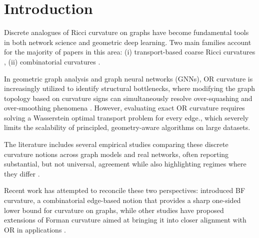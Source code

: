 \documentclass[twoside,11pt]{article}
\numberwithin{equation}{section}
\numberwithin{theorem}{section}
\numberwithin{example}{section}
\begin{document}

\section{Introduction}
\label{sec:introduction}
Discrete analogues of Ricci curvature on graphs have become fundamental tools in both network science and geometric deep learning. Two main families account for the majority of papers in this area: (i) transport-based coarse Ricci curvatures \citep{ollivier_ricci_2009, lin_curvature_2011}, (ii) combinatorial curvatures \citep{forman_method_2003,sreejith_forman_2016,weber_forman_2016,samal_comparative_2018}.

In geometric graph analysis and graph neural networks (GNNs), OR curvature is increasingly utilized to identify structural bottlenecks, where modifying the graph topology based on curvature signs can simultaneously resolve over-squashing and over-smoothing phenomena \citep[e.g.][]{nguyen_over_2023,liu_curvdrop_2023}. However, evaluating exact OR curvature requires solving a Wasserstein optimal transport problem for every edge., which severely limits the scalability of principled, geometry-aware algorithms on large datasets. 

The literature includes several empirical studies comparing these discrete curvature notions across graph models and real networks, often reporting substantial, but not universal, agreement while also highlighting regimes where they differ \citep{sreejith_systematic_2017, samal_comparative_2018, saucan_discrete_2018}. 

Recent work has attempted to reconcile these two perspectives: \citet{topping_squashing_2022} introduced BF curvature, a combinatorial edge-based notion that provides a sharp one-sided lower bound for \cite{lin_curvature_2011} curvature on graphs, while other studies have proposed extensions of Forman curvature aimed at bringing it into closer alignment with OR in applications \citep{tee_enhanced_2021, samal_comparative_2018}.
\end{document}
